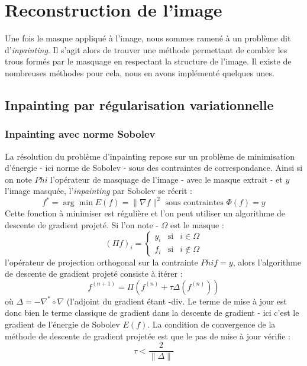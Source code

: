 \section{Reconstruction de l'image}

Une fois le masque appliqué à l'image, nous sommes ramené à un problème dit d'\emph{inpainting}. Il s'agit alors de trouver une méthode permettant de combler les trous formés par le masquage en respectant la structure de l'image. Il existe de nombreuses méthodes pour cela, nous en avons implémenté quelques unes. 

\subsection{Inpainting par régularisation variationnelle}

\subsubsection{Inpainting avec norme Sobolev}

La résolution du problème d'inpainting repose sur un problème de minimisation d'énergie - ici norme de Sobolev - sous des contraintes de correspondance. Ainsi si on note $Phi$ l'opérateur de masquage de l'image - avec le masque extrait - et $y$ l'image masquée, l'\emph{inpainting} par Sobolev se récrit :
\begin{equation}
f^* = \arg \min E(f) = \|\nabla f \|^2 \text{ sous contraintes } \Phi(f) = y
\end{equation}
Cette fonction à minimiser est régulière et l'on peut utiliser un algorithme de descente de gradient projeté. Si l'on note - $\Omega$ est le masque :
\begin{equation}
(\Pi f)_i = 
\left\{
\begin{array}{lll}
y_i & \text{si} & i\in\Omega \\
f_i & \text{si} & i\notin\Omega
\end{array}
\right.
\end{equation}
l'opérateur de projection orthogonal sur la contrainte $Phi f = y$, alors l'algorithme de descente de gradient projeté consiste à itérer : 
\begin{equation}
f^{(n+1)} = \Pi \left( f^{(n)} + \tau \Delta(f^{(n)})\right)
\end{equation}
où $\Delta = - \nabla^* \circ \nabla$ (l'adjoint du gradient étant -div. Le terme de mise à jour est donc bien le terme classique de gradient dans la descente de gradient - ici c'est le gradient de l'énergie de Sobolev $E(f)$. La condition de convergence de la méthode de descente de gradient projetée est que le pas de mise à jour vérifie : 
\begin{equation}
\tau < \frac{2}{\|\Delta \|}
\end{equation}

